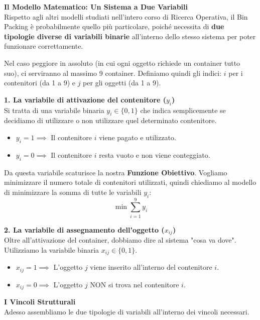 \documentclass[12pt, a4paper]{article}
\newcommand{\separatore}{\noindent{\color{titlecolor!50}\rule{\textwidth}{0.6pt}}}
\begin{document}
	\vspace{0.6cm}
	\separatore
	\vspace{0.4cm}
	
	\textbf{Il Modello Matematico: Un Sistema a Due Variabili}\\
	Rispetto agli altri modelli studiati nell'intero corso di Ricerca Operativa, il Bin Packing è probabilmente quello più particolare, poiché necessita di \textbf{due tipologie diverse di variabili binarie} all'interno dello stesso sistema per poter funzionare correttamente.
	
	Nel caso peggiore in assoluto (in cui ogni oggetto richiede un container tutto suo), ci serviranno al massimo 9 container. Definiamo quindi gli indici: $i$ per i contenitori (da 1 a 9) e $j$ per gli oggetti (da 1 a 9).
	
	\textbf{1. La variabile di attivazione del contenitore ($y_i$)}\\
	Si tratta di una variabile binaria $y_i \in \{0, 1\}$ che indica semplicemente se decidiamo di utilizzare o non utilizzare quel determinato contenitore. 
	\begin{itemize}[label=-, itemsep=1pt]
		\item $y_i = 1 \implies$ Il contenitore $i$ viene pagato e utilizzato.
		\item $y_i = 0 \implies$ Il contenitore $i$ resta vuoto e non viene conteggiato.
	\end{itemize}
	Da questa variabile scaturisce la nostra \textbf{Funzione Obiettivo}. Vogliamo minimizzare il numero totale di contenitori utilizzati, quindi chiediamo al modello di minimizzare la somma di tutte le variabili $y_i$:
	\[
	\min \sum_{i=1}^9 y_i
	\]
	
	\textbf{2. La variabile di assegnamento dell'oggetto ($x_{ij}$)}\\
	Oltre all'attivazione del container, dobbiamo dire al sistema "cosa va dove". Utilizziamo la variabile binaria $x_{ij} \in \{0, 1\}$.
	\begin{itemize}[label=-, itemsep=1pt]
		\item $x_{ij} = 1 \implies$ L'oggetto $j$ viene inserito all'interno del contenitore $i$.
		\item $x_{ij} = 0 \implies$ L'oggetto $j$ NON si trova nel contenitore $i$.
	\end{itemize}
	
	\vspace{0.4cm}
	\textbf{I Vincoli Strutturali}\\
	Adesso assembliamo le due tipologie di variabili all'interno dei vincoli necessari.
	
\end{document}
